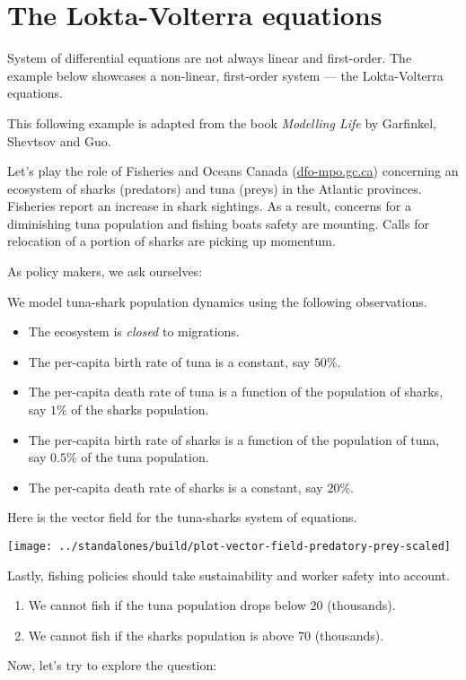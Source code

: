 \documentclass[../main.tex]{subfiles}
\begin{document}
 \section{The Lokta-Volterra equations}

System of differential equations are not always linear and first-order. The example below showcases a non-linear, first-order system --- the Lokta-Volterra equations.

This following example is adapted from the book \emph{Modelling Life} by Garfinkel, Shevtsov and Guo.

\begin{example} 
  Let's play the role of Fisheries and Oceans Canada (\href{https://www.dfo-mpo.gc.ca}{\ttfamily dfo-mpo.gc.ca}) concerning an ecosystem of sharks (predators) and tuna (preys) in the Atlantic provinces.  Fisheries report an increase in shark sightings.  As a result, concerns for a diminishing tuna population and fishing boats safety are mounting.  Calls for relocation of a portion of sharks are picking up momentum. 

  As policy makers, we ask ourselves:  %

  \medskip

  We model tuna-shark population dynamics using the following observations.
  \begin{itemize}
    \item The ecosystem is \emph{closed} to migrations.
    \item The per-capita birth rate of tuna is a constant, say \(50\%\).
    \item The per-capita death rate of tuna is a function of the population of sharks, say \(1\%\) of the sharks population.
    \item The per-capita birth rate of sharks is a function of the population of tuna, say \(0.5\%\) of the tuna population.
    \item The per-capita death rate of sharks is a constant, say \(20\%\).
  \end{itemize}

  \clearpage

  Here is the vector field for the tuna-sharks system of equations.

  \texttt{[image: ../standalones/build/plot-vector-field-predatory-prey-scaled]}

  Lastly, fishing policies should take sustainability and worker safety into account.
  \begin{enumerate}
    \item We cannot fish if the tuna population drops below 20 (thousands).
    \item We cannot fish if the sharks population is above 70 (thousands).
  \end{enumerate}

  Now, let's try to explore the question: 

\end{example}
\end{document}
